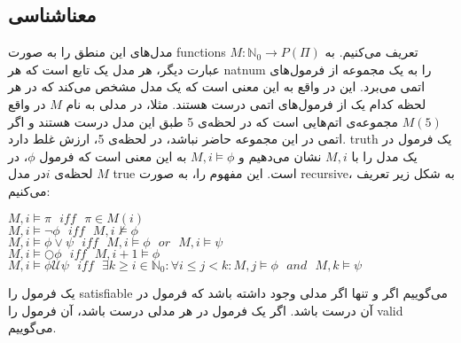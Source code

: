 \subsection{معناشناسی }

مدل‌های این منطق را به صورت \glspl*{function}
$M:\mathbb{N}_0 \rightarrow \mathit{P}(\Pi)$ 
تعریف می‌کنیم. به عبارت دیگر، هر مدل یک تابع است که هر \gls*{natnum} را به یک مجموعه از فرمول‌های اتمی می‌برد. این در واقع به این معنی است که یک مدل مشخص می‌کند که در هر لحظه کدام یک از فرمول‌های اتمی درست هستند. مثلا، در مدلی به نام $M$ در واقع
$M(5)$
مجموعه‌ی اتم‌هایی است که در لحظه‌ی 5 طبق این مدل درست هستند و اگر اتمی در این مجموعه حاضر نباشد، در لحظه‌ی 5، ارزش غلط دارد.
\gls*{truth} یک فرمول در یک مدل را با 
$M,i$
نشان می‌دهیم و 
$M,i \models \phi$
به این معنی است که فرمول $\phi$، در لحظه‌ی $i$در مدل $M$ \gls*{true} است. این مفهوم را، به صورت \gls*{recursive}، به شکل زیر تعریف می‌کنیم:


\begin{flushleft}
$	M,i \models \pi \:\:\: \mathit{iff} \:\:\: \pi \in M(i)$\\
$	M,i \models \neg \phi \:\:\: \mathit{iff} \:\:\: M,i\nvDash \phi$\\
$	M,i \models \phi \lor \psi \:\:\: \mathit{iff} \:\:\: M,i \models \phi \:\:\: \mathit{or} \:\:\: M,i \models \psi$\\
	 $M,i \models \bigcirc \phi  \:\:\:  \mathit{iff} \:\:\: M,i+1 \models \phi$\\
	 $M,i \models \phi \mathcal{U} \psi \:\:\: \mathit{iff} \:\:\: 
	 \exists k \geq i \in \mathbb{N}_0: \forall i\leq j< k: M,j \models \phi \:\:\: \mathit{and} \:\:\: M,k \models \psi$
\end{flushleft}


یک فرمول را \gls*{satisfiable} می‌گوییم اگر و تنها اگر مدلی وجود داشته باشد که فرمول در آن درست باشد.
اگر یک فرمول در هر مدلی درست باشد، آن فرمول را \gls*{valid} می‌گوییم.\\



